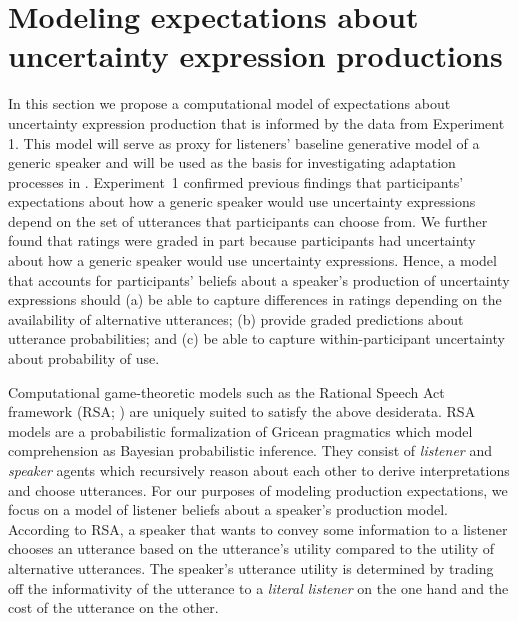  





\section{Modeling expectations about uncertainty expression productions}
\label{sec:model-baseline}

In this section we propose a computational model of expectations about uncertainty expression production that is informed by the data from Experiment 1. This model will serve as proxy for listeners' baseline generative model of a generic speaker and will be used as the basis for investigating adaptation processes in . Experiment~1 confirmed previous findings that participants' expectations 
about how a generic speaker would use uncertainty expressions 
depend on the set of utterances that participants can choose from.
We further found that ratings were graded in part because participants had uncertainty about how a generic speaker would use uncertainty expressions. 
Hence, a model that accounts for participants' beliefs about a speaker's production of uncertainty expressions
 should  (a) be able to capture differences in ratings depending on the availability of alternative utterances;
(b) provide graded predictions about utterance probabilities; 
and (c) be able to capture within-participant uncertainty about probability of use.

Computational game-theoretic models such as the Rational Speech Act 
framework (RSA; \cite{Goodman2016})  are uniquely suited to satisfy the above desiderata.
RSA models are a probabilistic formalization of Gricean pragmatics which model comprehension as Bayesian probabilistic inference. 
They consist of \textit{listener} and \textit{speaker} agents which recursively reason about each other to derive interpretations and choose utterances. 
For our purposes of modeling production expectations, we focus on a model of listener beliefs about a speaker's production model.
  According to  RSA, a {speaker} that wants to
 convey some information to a {listener}
chooses an utterance based on the utterance's utility compared to the utility of alternative utterances. 
The {speaker}'s utterance utility is determined by trading off the informativity of the utterance to a \textit{literal listener} on the one hand and the cost of the utterance on the other.

